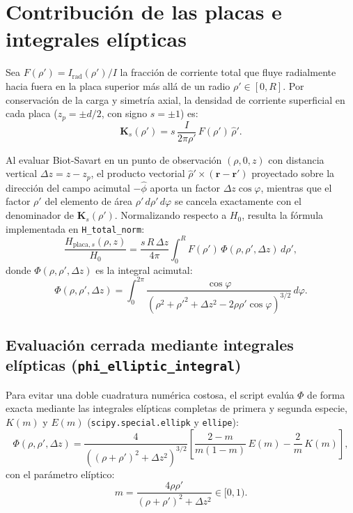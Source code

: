 \documentclass[11pt]{article}
\begin{document}
\section{Contribución de las placas e integrales elípticas}

Sea $F(\rho') = I_{\mathrm{rad}}(\rho') / I$ la fracción de corriente total que fluye radialmente hacia fuera en la placa superior más allá de un radio $\rho' \in [0, R]$. Por conservación de la carga y simetría axial, la densidad de corriente superficial en cada placa ($z_p = \pm d/2$, con signo $s = \pm 1$) es:
\begin{equation}
    \mathbf{K}_s(\rho') = s\,\frac{I}{2\pi \rho'}\,F(\rho')\,\hat{\rho}'.
\end{equation}

Al evaluar Biot-Savart en un punto de observación $(\rho, 0, z)$ con distancia vertical $\Delta z = z - z_p$, el producto vectorial $\hat{\rho}' \times (\mathbf{r} - \mathbf{r}')$ proyectado sobre la dirección del campo acimutal $-\hat{\phi}$ aporta un factor $\Delta z \cos\varphi$, mientras que el factor $\rho'$ del elemento de área $\rho'\,d\rho'\,d\varphi$ se cancela exactamente con el denominador de $\mathbf{K}_s(\rho')$. Normalizando respecto a $H_0$, resulta la fórmula implementada en \texttt{H\_total\_norm}:
\begin{equation}
    \frac{H_{\mathrm{placa}, s}(\rho, z)}{H_0} = \frac{s\,R\,\Delta z}{4\pi} \int_{0}^{R} F(\rho')\,\Phi(\rho, \rho', \Delta z)\,d\rho',
\end{equation}
donde $\Phi(\rho, \rho', \Delta z)$ es la integral acimutal:
\begin{equation}
    \Phi(\rho, \rho', \Delta z) = \int_{0}^{2\pi} \frac{\cos\varphi}{\left( \rho^2 + \rho'^2 + \Delta z^2 - 2\rho\rho'\cos\varphi \right)^{3/2}}\,d\varphi.
\end{equation}

\subsection{Evaluación cerrada mediante integrales elípticas (\texttt{phi\_elliptic\_integral})}

Para evitar una doble cuadratura numérica costosa, el script evalúa $\Phi$ de forma exacta mediante las integrales elípticas completas de primera y segunda especie, $K(m)$ y $E(m)$ (\texttt{scipy.special.ellipk} y \texttt{ellipe}):
\begin{equation}
    \Phi(\rho, \rho', \Delta z) = \frac{4}{\left((\rho + \rho')^2 + \Delta z^2\right)^{3/2}} \left[ \frac{2 - m}{m(1 - m)}\,E(m) - \frac{2}{m}\,K(m) \right],
\end{equation}
con el parámetro elíptico:
\begin{equation}
    m = \frac{4\rho\rho'}{(\rho + \rho')^2 + \Delta z^2} \in [0, 1).
\end{equation}
\end{document}

